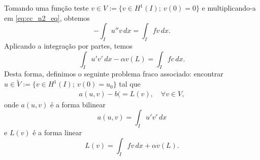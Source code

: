 Tomando uma função teste $v\in V:=\{v\in H^1(I);~v(0)=0\}$ e multiplicando-a em \eqref{eq:cc_n2_eq}, obtemos
\begin{equation}
  - \int_I u''v\,dx = \int_I fv\,dx.
\end{equation}
Aplicando a integração por partes, temos
\begin{equation}
  \int_I u'v'\,dx - \alpha v(L)= \int_I fc\,dx.
\end{equation}
Desta forma, definimos o seguinte problema fraco associado: encontrar $u\in \tilde{V} := \{v\in H^1(I);~v(0)=u_0\}$ tal que
\begin{align}
  a(u,v) - b( = L(v),\quad\forall v\in V,
\end{align}
onde $a(u,v)$ é a forma bilinear
\begin{equation}
  a(u,v) = \int_I u'v'\,dx
\end{equation}
e $L(v)$ é a forma linear
\begin{equation}
  L(v) = \int_I fv\,dx + \alpha v(L).
\end{equation}

